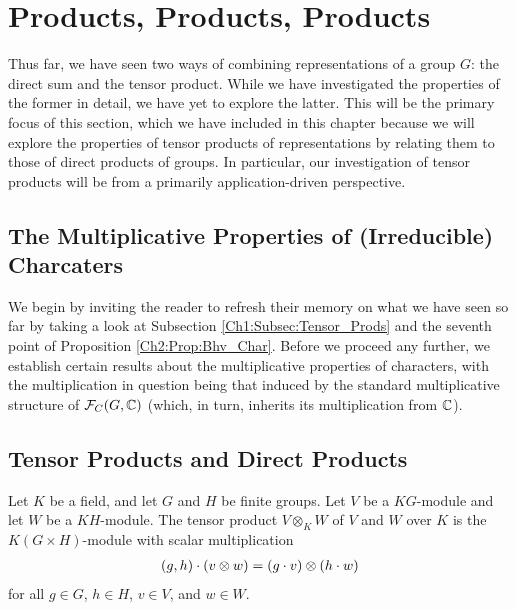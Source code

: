 \section{Products, Products, Products}\label{Ch3:Sec:Products}

Thus far, we have seen two ways of combining representations of a group $G$: the direct sum and the tensor product. While we have investigated the properties of the former in detail, we have yet to explore the latter. This will be the primary focus of this section, which we have included in this chapter because we will explore the properties of tensor products of representations by relating them to those of direct products of groups. In particular, our investigation of tensor products will be from a primarily application-driven perspective.

\subsection{The Multiplicative Properties of (Irreducible) Charcaters}

We begin by inviting the reader to refresh their memory on what we have seen so far by taking a look at Subsection \ref{Ch1:Subsec:Tensor_Prods} and the seventh point of Proposition \ref{Ch2:Prop:Bhv_Char}. Before we proceed any further, we establish certain results about the multiplicative properties of characters, with the multiplication in question being that induced by the standard multiplicative structure of $\mathcal{F}_C\!\left( G, \mathbb{C} \right)$ (which, in turn, inherits its multiplication from $\mathbb{C}$).


\subsection{Tensor Products and Direct Products}

\begin{boxdefinition}
    Let $K$ be a field, and let $G$ and $H$ be finite groups. Let $V$ be a $KG$-module and let $W$ be a $KH$-module. The tensor product $V \otimes_K W$ of $V$ and $W$ over $K$ is the $K(G \times H)$-module with scalar multiplication
    \begin{align}
        \left( g, h \right) \cdot \left( v \otimes w \right) = \left( g \cdot v \right) \otimes \left( h \cdot w \right)
    \end{align}
    for all $g \in G$, $h \in H$, $v \in V$, and $w \in W$.
\end{boxdefinition}


